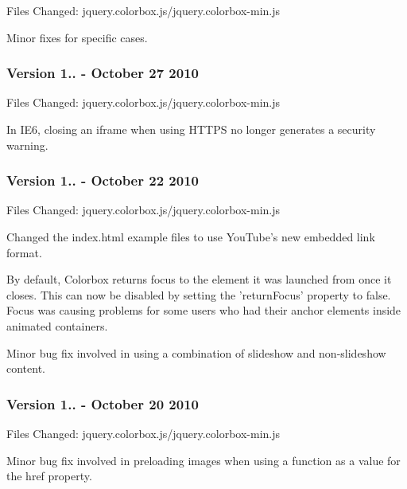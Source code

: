Files Changed\-: jquery.\-colorbox.\-js/jquery.colorbox-\/min.\-js


\begin{DoxyItemize}
\item Minor fixes for specific cases.
\end{DoxyItemize}

\subsubsection*{Version 1.. -\/ October 27 2010}

Files Changed\-: jquery.\-colorbox.\-js/jquery.colorbox-\/min.\-js


\begin{DoxyItemize}
\item In I\-E6, closing an iframe when using H\-T\-T\-P\-S no longer generates a security warning.
\end{DoxyItemize}

\subsubsection*{Version 1.. -\/ October 22 2010}

Files Changed\-: jquery.\-colorbox.\-js/jquery.colorbox-\/min.\-js


\begin{DoxyItemize}
\item Changed the index.\-html example files to use You\-Tube's new embedded link format.
\item By default, Colorbox returns focus to the element it was launched from once it closes. This can now be disabled by setting the 'return\-Focus' property to false. Focus was causing problems for some users who had their anchor elements inside animated containers.
\item Minor bug fix involved in using a combination of slideshow and non-\/slideshow content.
\end{DoxyItemize}

\subsubsection*{Version 1.. -\/ October 20 2010}

Files Changed\-: jquery.\-colorbox.\-js/jquery.colorbox-\/min.\-js


\begin{DoxyItemize}
\item Minor bug fix involved in preloading images when using a function as a value for the href property.
\end{DoxyItemize}

